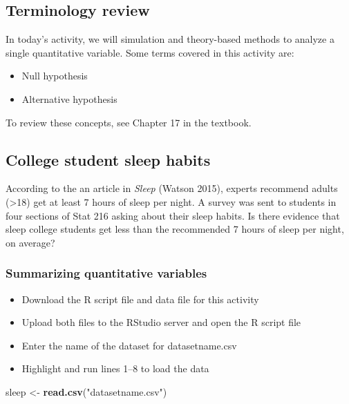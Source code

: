 \documentclass[
]{report}
\newenvironment{Shaded}{\begin{snugshade}}{\end{snugshade}}
\newcommand{\FunctionTok}[1]{\textcolor[rgb]{0.13,0.29,0.53}{\textbf{#1}}}
\newcommand{\NormalTok}[1]{#1}
\newcommand{\OtherTok}[1]{\textcolor[rgb]{0.56,0.35,0.01}{#1}}
\newcommand{\StringTok}[1]{\textcolor[rgb]{0.31,0.60,0.02}{#1}}
\begin{document}
\subsection{Terminology review}\label{terminology-review-1}

In today's activity, we will simulation and theory-based methods to analyze a single quantitative variable. Some terms covered in this activity are:

\begin{itemize}
\item
  Null hypothesis
\item
  Alternative hypothesis
\end{itemize}

To review these concepts, see Chapter 17 in the textbook.

\subsection{College student sleep habits}\label{college-student-sleep-habits}

According to the an article in \emph{Sleep} (Watson 2015), experts recommend adults (\textgreater18) get at least 7 hours of sleep per night. A survey was sent to students in four sections of Stat 216 asking about their sleep habits. Is there evidence that sleep college students get less than the recommended 7 hours of sleep per night, on average?

\subsubsection*{Summarizing quantitative variables}\label{summarizing-quantitative-variables-1}

\begin{itemize}
\item
  Download the R script file and data file for this activity
\item
  Upload both files to the RStudio server and open the R script file
\item
  Enter the name of the dataset for datasetname.csv
\item
  Highlight and run lines 1--8 to load the data
\end{itemize}

\begin{Shaded}
\begin{Highlighting}[]
\NormalTok{sleep }\OtherTok{\textless{}{-}} \FunctionTok{read.csv}\NormalTok{(}\StringTok{"datasetname.csv"}\NormalTok{)}
\end{Highlighting}
\end{Shaded}
\end{document}

